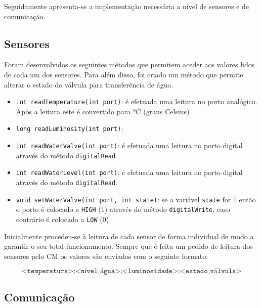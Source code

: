 Seguidamente apresenta-se a implementação necessária a nível de sensores e de comunicação. 

\subsection{Sensores}



Foram desenvolvidos os seguintes métodos que permitem aceder aos valores lidos de cada um dos sensores. Para além disso, foi criado um método que permite alterar o estado do válvula para transferência de água. 

\begin{itemize}
	\item \texttt{int readTemperature(int port)}: é efetuada uma leitura no porto analógico. Após a leitura este é convertido para ºC (graus Celsius)
	
	\item \texttt{long readLuminosity(int port)}: 
	
	\item \texttt{int readWaterValve(int port)}: é efetuada uma leitura no porto digital através do método \texttt{digitalRead}. 
	
	\item \texttt{int readWaterLevel(int port)}: é efetuada uma leitura no porto digital através do método \texttt{digitalRead}.
	
	
	\item \texttt{void setWaterValve(int port, int state)}: se a variável \texttt{state} for 1 então o porto é colocado a \texttt{HIGH} (1) através do método \texttt{digitalWrite}, caso contrário é colocado a \texttt{LOW} (0)
	
\end{itemize}

Inicialmente procedeu-se à leitura de cada sensor de forma individual de modo a garantir o seu total funcionamento. Sempre que é feita um pedido de leitura dos sensores pelo \ac{CM} os valores são enviados com o seguinte formato: 

\begin{equation} 
\label{eq:someequation}
\texttt{<temperatura>;<nível\_água>;<luminosidade>;<estado\_válvula>}
\end{equation}

\subsection{Comunicação}


